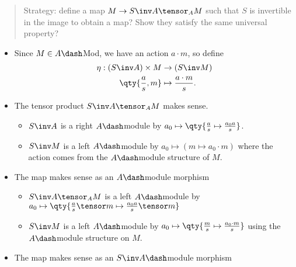 \begin{quote}
Strategy: define a map \(M\to S\inv A \tensor_A M\) such that \(S\) is
invertible in the image to obtain a map? Show they satisfy the same
universal property?
\end{quote}

\begin{itemize}
\item
  Since \(M \in A\dash\)Mod, we have an action \(a\cdot m\), so define
  \begin{align*}
  \eta: (S\inv A)\times M &\to (S\inv M) \\
  \qty{ {a\over s}, m } &\mapsto {a\cdot m \over s }
  .\end{align*}
\item
  The tensor product \(S\inv A \tensor_A M\) makes sense.

  \begin{itemize}
  \tightlist
  \item
    \(S\inv A\) is a right \(A\dash\)module by
    \(a_0 \mapsto \qty{ {a\over s} \mapsto {a_0 a \over s}}\).
  \item
    \(S\inv M\) is a left \(A\dash\)module by
    \(a_0 \mapsto (m \mapsto a_0 \cdot m)\) where the action comes from
    the \(A\dash\)module structure of \(M\).
  \end{itemize}
\item
  The map makes sense as an \(A\dash\)module morphism

  \begin{itemize}
  \tightlist
  \item
    \(S\inv A \tensor_A M\) is a left \(A\dash\)module by
    \(a_0 \mapsto \qty{{a\over s}\tensor m \mapsto {a_0 a \over s} \tensor m}\)
  \item
    \(S\inv M\) is a left \(A\dash\)module by
    \(a_0 \mapsto \qty{ {m\over s } \mapsto {a_0 \cdot m \over s}}\)
    using the \(A\dash\)module structure on \(M\).
  \end{itemize}
\item
  The map makes sense as an \(S\inv A\dash\)module morphism


\end{itemize}
